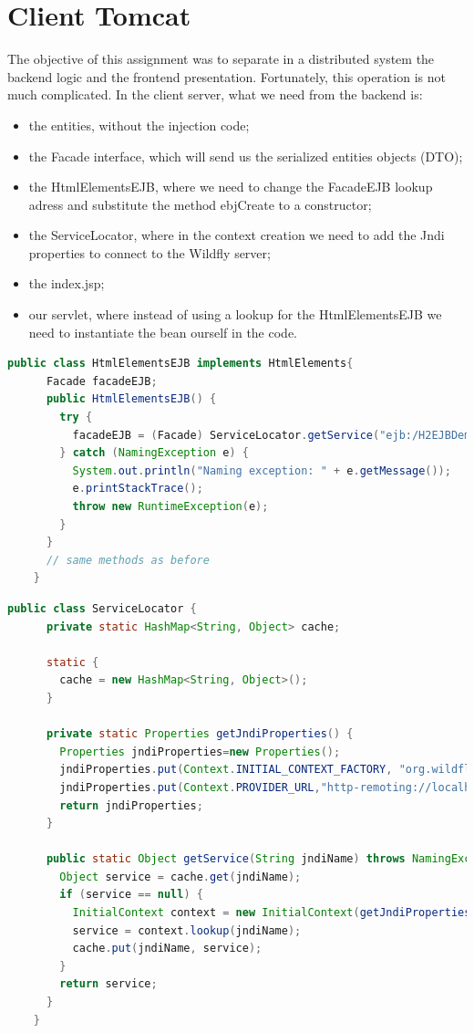 \documentclass[12pt, a4paper]{article}
\begin{document}
  \section{Client Tomcat}
  The objective of this assignment was to separate in a distributed system the backend logic and the frontend presentation. Fortunately, this operation is not much complicated.
  In the client server, what we need from the backend is:
  \begin{itemize}
  \item  the entities, without the injection code;
  \item  the Facade interface, which will send us the serialized entities objects (DTO);
  \item  the HtmlElementsEJB, where we need to change the FacadeEJB lookup adress and substitute the method ebjCreate to a constructor;
  \item  the ServiceLocator, where in the context creation we need to add the Jndi properties to connect to the Wildfly server;
  \item  the index.jsp;
  \item  our servlet, where instead of using a lookup for the HtmlElementsEJB we need to instantiate the bean ourself in the code.
  \end{itemize}

  \begin{lstlisting}[language=java, caption={The new HtmlElementsEJB}]
    public class HtmlElementsEJB implements HtmlElements{
      Facade facadeEJB;
      public HtmlElementsEJB() {
        try {
          facadeEJB = (Facade) ServiceLocator.getService("ejb:/H2EJBDemo-1.0-SNAPSHOT/FacadeEJB!it.marrocco.h2ejbdemo.ejb.Facade");
        } catch (NamingException e) {
          System.out.println("Naming exception: " + e.getMessage());
          e.printStackTrace();
          throw new RuntimeException(e);
        }
      }
      // same methods as before
    }
  \end{lstlisting}

  \begin{lstlisting}[language=java, caption={The new ServiceLocator}]
    public class ServiceLocator {
      private static HashMap<String, Object> cache;

      static {
        cache = new HashMap<String, Object>();
      }

      private static Properties getJndiProperties() {
        Properties jndiProperties=new Properties();
        jndiProperties.put(Context.INITIAL_CONTEXT_FACTORY, "org.wildfly.naming.client.WildFlyInitialContextFactory");
        jndiProperties.put(Context.PROVIDER_URL,"http-remoting://localhost:8080");
        return jndiProperties;
      }

      public static Object getService(String jndiName) throws NamingException {
        Object service = cache.get(jndiName);
        if (service == null) {
          InitialContext context = new InitialContext(getJndiProperties());
          service = context.lookup(jndiName);
          cache.put(jndiName, service);
        }
        return service;
      }
    }
  \end{lstlisting}
\end{document}
